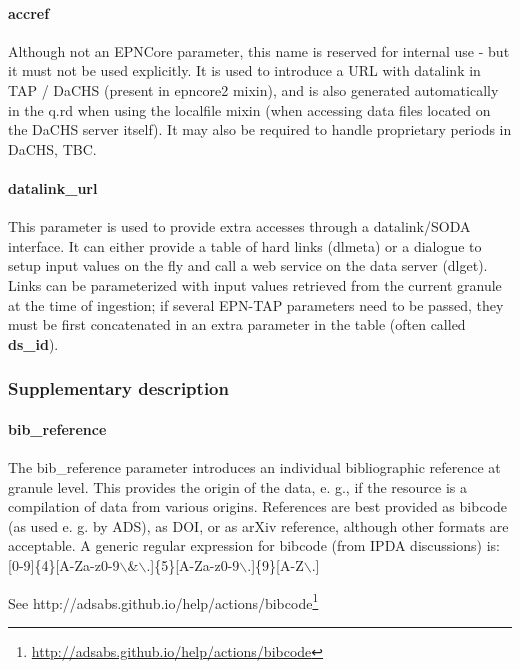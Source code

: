 \documentclass[11pt,a4paper]{ivoa}
\begin{document}
\paragraph{accref}

Although not an EPNCore parameter, this name is reserved for internal use - but it must not be used explicitly. It is used to introduce a URL with datalink in TAP / DaCHS (present in epncore2 mixin), and is also generated automatically in the q.rd when using the localfile mixin (when accessing data files located on the DaCHS server itself). It may also be required to handle proprietary periods in DaCHS, TBC. \\

\paragraph{datalink\_url}

This parameter is used to provide extra accesses through a datalink/SODA interface. It can either provide a table of hard links (dlmeta) or a dialogue to setup input values on the fly and call a web service on the data server (dlget). Links can be parameterized with input values retrieved from the current granule at the time of ingestion; if several EPN-TAP parameters need to be passed, they must be first concatenated in an extra parameter in the table (often called \textbf{ds\_id}).

\subsubsection{Supplementary description}

\paragraph{bib\_reference}

The bib\_reference parameter introduces an individual bibliographic reference at granule level. This provides the origin of the data, e. g., if the resource is a compilation of data from various origins. References are best provided as bibcode (as used e. g. by ADS), as DOI, or as arXiv reference, although other formats are acceptable. A generic regular expression for bibcode (from IPDA discussions) is: [0-9]\{4\}[A-Za-z0-9$\backslash$\&$\backslash$.]\{5\}[A-Za-z0-9$\backslash$.]\{9\}[A-Z$\backslash$.] 

See http://adsabs.github.io/help/actions/bibcode\footnote{\url{http://adsabs.github.io/help/actions/bibcode}}
\end{document}
